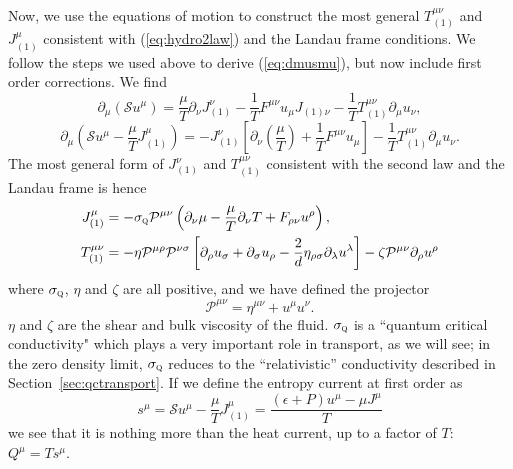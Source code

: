 \documentclass[10pt, oneside]{book}
\begin{document}
\begin{doublespace}
Now, we use the equations of motion to construct the most general $T^{\mu\nu}_{(1)}$ and $J^\mu_{(1)}$ consistent with (\ref{eq:hydro2law}) and the Landau frame conditions.   We follow the steps we used above to derive (\ref{eq:dmusmu}), but now include first order corrections.   We find \begin{equation}
\partial_\mu \left(\mathcal{S}u^\mu\right) = \frac{\mu}{T}\partial_\nu J^\nu_{(1)} - \frac{1}{T}F^{\mu\nu}u_\mu J_{(1)\nu} - \frac{1}{T}T^{\mu\nu}_{(1)} \partial_\mu u_\nu,
\end{equation}\begin{equation}
\partial_\mu \left(\mathcal{S}u^\mu - \frac{\mu}{T} J^\mu_{(1)}\right) = -J^\nu_{(1)} \left[\partial_\nu \left(\frac{\mu}{T}\right) + \frac{1}{T}F^{\mu\nu}u_\mu\right] - \frac{1}{T}T^{\mu\nu}_{(1)} \partial_\mu u_\nu.
\end{equation}
The most general form of $J_{(1)}^\nu$ and $T_{(1)}^{\mu\nu}$ consistent with the second law and the Landau frame is hence \begin{subequations}\begin{align}
J_{(1)}^\mu &= -\sigma_{\textsc{q}} \mathcal{P}^{\mu\nu}\left(\partial_\nu \mu - \frac{\mu}{T} \partial_\nu T + F_{\rho \nu}u^\rho\right), \\
T_{(1)}^{\mu\nu} &= -\eta \mathcal{P}^{\mu\rho}\mathcal{P}^{\nu\sigma}\left[ \partial_\rho u_\sigma + \partial_\sigma u_\rho- \frac{2}{d}\eta_{\rho\sigma} \partial_\lambda u^\lambda \right]  - \zeta\mathcal{P}^{\mu\nu} \partial_\rho u^\rho
\end{align}\end{subequations}
where $\sigma_{\textsc{q}}$, $\eta$ and $\zeta$ are all positive, and we have defined the projector \begin{equation}
\mathcal{P}^{\mu\nu} = \eta^{\mu\nu} + u^\mu u^\nu.
\end{equation}
$\eta$ and $\zeta$ are the shear and bulk viscosity of the fluid.   $\sigma_{\textsc{q}}$ is a ``quantum critical conductivity" which plays a very important role in transport, as we will see; in the zero density limit, $\sigma_{\textsc{q}}$ reduces to the ``relativistic'' conductivity
described in Section~\ref{sec:qctransport}. 
If we define the entropy current at first order as \begin{equation}
s^\mu = \mathcal{S}u^\mu - \frac{\mu}{T} J_{(1)}^\mu = \frac{(\epsilon+P)u^\mu - \mu J^\mu }{T}
\end{equation}we see that it is nothing more than the heat current, up to a factor of $T$:  $Q^\mu  =Ts^\mu$.


\end{doublespace}
\end{document}

